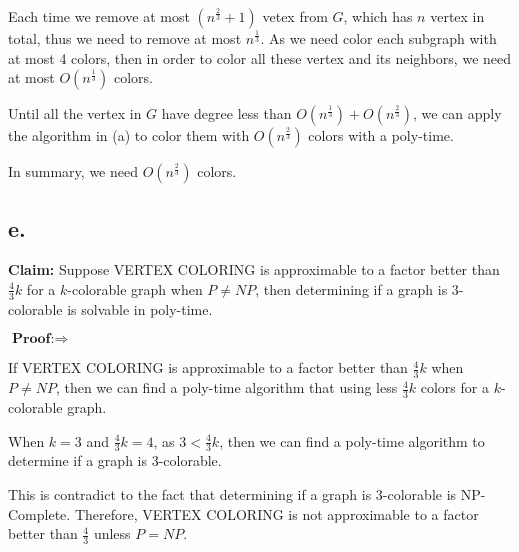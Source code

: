 \documentclass[a4paper,12pt]{article}
\begin{document}
Each time we remove at most $(n^{\frac{2}{3}}+1)$ vetex from $G$, which has $n$ vertex in total, thus we need to remove at most $ n^{\frac{1}{3}} $. As we need color each subgraph with at most 4 colors, then in order to color all these vertex and its neighbors, we need at most $O(n^{\frac{1}{3}})$ colors. 

Until all the vertex in $G$ have degree less than $O(n^{\frac{1}{3}})+O(n^{\frac{2}{3}})$, we can apply the algorithm in (a) to color them with $O(n^{\frac{2}{3}})$ colors with a poly-time.

In summary, we need $O(n^{\frac{2}{3}}) $ colors.

\subsection*{e. }
\noindent \textbf{Claim:}
Suppose VERTEX COLORING is approximable to a factor better than $\frac{4}{3} k$ for a $k$-colorable graph when $P \neq NP$, then determining if a graph is 3-colorable is solvable in poly-time.

$\textbf{Proof:} \Rightarrow $  

If VERTEX COLORING is approximable to a factor better than $\frac{4}{3} k$ when $P \neq NP$, then we can find a poly-time algorithm that using less $\frac{4}{3} k$ colors for a $k$-colorable graph. 

When $k=3$ and $\frac{4}{3} k=4$, as $ 3 < \frac{4}{3} k$, then we can find a poly-time algorithm to determine if a graph is 3-colorable.

This is contradict to the fact that determining if a graph is 3-colorable is NP-Complete. Therefore, VERTEX COLORING  is not approximable to a factor better than $\frac{4}{3}$ unless $P=NP$.
 
 
 
\end{document}
